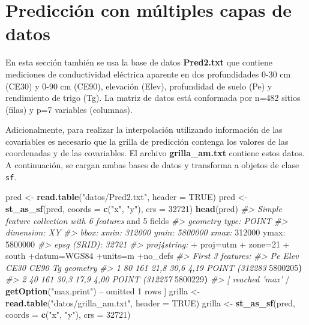 \documentclass[11pt,b5paper,]{krantz}
\newenvironment{Shaded}{}{}
\newcommand{\KeywordTok}[1]{\textcolor[rgb]{0.00,0.44,0.13}{\textbf{#1}}}
\newcommand{\DataTypeTok}[1]{\textcolor[rgb]{0.56,0.13,0.00}{#1}}
\newcommand{\DecValTok}[1]{\textcolor[rgb]{0.25,0.63,0.44}{#1}}
\newcommand{\StringTok}[1]{\textcolor[rgb]{0.25,0.44,0.63}{#1}}
\newcommand{\CommentTok}[1]{\textcolor[rgb]{0.38,0.63,0.69}{\textit{#1}}}
\newcommand{\OtherTok}[1]{\textcolor[rgb]{0.00,0.44,0.13}{#1}}
\newcommand{\OperatorTok}[1]{\textcolor[rgb]{0.40,0.40,0.40}{#1}}
\newcommand{\ErrorTok}[1]{\textcolor[rgb]{1.00,0.00,0.00}{\textbf{#1}}}
\newcommand{\NormalTok}[1]{#1}
\begin{document}
\section{Predicción con múltiples capas de
datos}\label{predicciuxf3n-con-muxfaltiples-capas-de-datos-1}

En esta sección también se usa la base de datos \textbf{Pred2.txt} que
contiene mediciones de conductividad eléctrica aparente en dos
profundidades 0-30 cm (CE30) y 0-90 cm (CE90), elevación (Elev),
profundidad de suelo (Pe) y rendimiento de trigo (Tg). La matriz de
datos está conformada por n=482 sitios (filas) y p=7 variables
(columnas).

Adicionalmente, para realizar la interpolación utilizando información de
las covariables es necesario que la grilla de predicción contenga los
valores de las coordenadas y de las covariables. El archivo
\textbf{grilla\_am.txt} contiene estos datos. A continuación, se cargan
ambas bases de datos y transforma a objetos de clase \texttt{sf}.

\begin{Shaded}
\begin{Highlighting}[]
\NormalTok{pred <-}\StringTok{ }\KeywordTok{read.table}\NormalTok{(}\StringTok{"datos/Pred2.txt"}\NormalTok{, }
                   \DataTypeTok{header =} \OtherTok{TRUE}\NormalTok{)}
\NormalTok{pred <-}\StringTok{ }\KeywordTok{st_as_sf}\NormalTok{(pred, }\DataTypeTok{coords =} \KeywordTok{c}\NormalTok{(}\StringTok{"x"}\NormalTok{, }\StringTok{"y"}\NormalTok{), }
                 \DataTypeTok{crs =} \DecValTok{32721}\NormalTok{)}
\KeywordTok{head}\NormalTok{(pred)}
\CommentTok{#> Simple feature collection with 6 features}
\NormalTok{and }\DecValTok{5}\NormalTok{ fields}
\CommentTok{#> geometry type: POINT}
\CommentTok{#> dimension: XY}
\CommentTok{#> bbox: xmin: 312000 ymin: 5800000 xmax:}
\DecValTok{312000}\NormalTok{ ymax}\OperatorTok{:}\StringTok{ }\DecValTok{5800000}
\CommentTok{#> epsg (SRID): 32721}
\CommentTok{#> proj4string: }
    \OperatorTok{+}\StringTok{ }\NormalTok{proj=utm }
    \OperatorTok{+}\StringTok{ }\NormalTok{zone=}\DecValTok{21} 
    \OperatorTok{+}\StringTok{ }\NormalTok{south}
\OperatorTok{+}\NormalTok{datum=WGS84 }\OperatorTok{+}\NormalTok{units=m }\OperatorTok{+}\NormalTok{no_defs}
\CommentTok{#> First 3 features:}
\CommentTok{#> Pe Elev CE30 CE90 Tg geometry}
\CommentTok{#> 1 80 161 21,8 30,6 4,19 POINT (312283}
\DecValTok{5800205}\ErrorTok{)}
\CommentTok{#> 2 40 161 30,3 17,9 4,00 POINT (312257}
\DecValTok{5800229}\ErrorTok{)}
\CommentTok{#> [ reached 'max'}
    \OperatorTok{/}\StringTok{ }\KeywordTok{getOption}\NormalTok{(}\StringTok{"max.print"}\NormalTok{) }\OperatorTok{--}
\NormalTok{omitted }\DecValTok{1}\NormalTok{ rows ]}
\NormalTok{grilla <-}\StringTok{ }\KeywordTok{read.table}\NormalTok{(}\StringTok{"datos/grilla_am.txt"}\NormalTok{, }
                     \DataTypeTok{header =} \OtherTok{TRUE}\NormalTok{)}
\NormalTok{grilla <-}\StringTok{ }\KeywordTok{st_as_sf}\NormalTok{(pred, }\DataTypeTok{coords =} \KeywordTok{c}\NormalTok{(}\StringTok{"x"}\NormalTok{, }\StringTok{"y"}\NormalTok{), }
                   \DataTypeTok{crs =} \DecValTok{32721}\NormalTok{)}
\end{Highlighting}
\end{Shaded}
\end{document}
